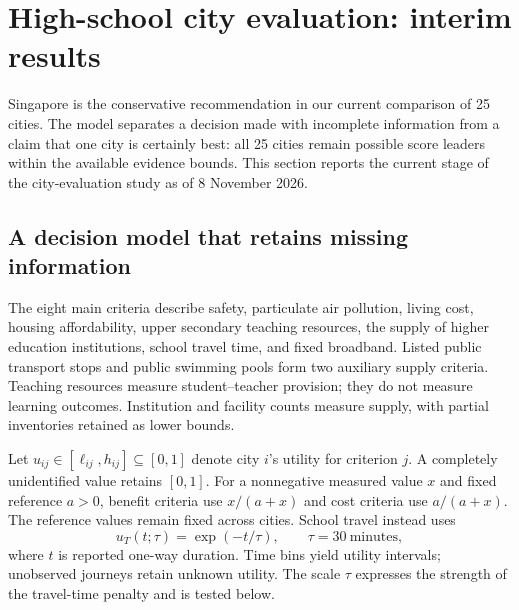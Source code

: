 \clearpage
\begingroup
\setlength{\tabcolsep}{5pt}
\setlength{\parskip}{0.35\baselineskip}
\section{High-school city evaluation: interim results}
\label{sec:t4progress}

Singapore is the conservative recommendation in our current comparison of
25 cities. The model separates a decision made with incomplete information
from a claim that one city is certainly best: all 25 cities remain possible
score leaders within the available evidence bounds. This section reports the
current stage of the city-evaluation study as of 8 November 2026.

\subsection{A decision model that retains missing information}
The eight main criteria describe safety, particulate air pollution, living
cost, housing affordability, upper secondary teaching resources, the supply
of higher education institutions, school travel time, and fixed broadband. Listed public
transport stops and public swimming pools form two auxiliary supply criteria.
Teaching resources measure student--teacher provision; they do not measure
learning outcomes. Institution and facility counts measure supply, with partial
inventories retained as lower bounds.

Let $u_{ij}\in[\ell_{ij},h_{ij}]\subseteq[0,1]$ denote city $i$'s utility
for criterion $j$. A completely unidentified value retains $[0,1]$.
For a nonnegative measured value $x$ and fixed reference $a>0$, benefit
criteria use $x/(a+x)$ and cost criteria use $a/(a+x)$. The reference values
remain fixed across cities. School travel instead uses
\begin{equation}
 u_T(t;\tau)=\exp(-t/\tau),\qquad \tau=30\ \text{minutes},
 \label{eq:t4travel}
\end{equation}
where $t$ is reported one-way duration. Time bins yield utility intervals;
unobserved journeys retain unknown utility. The scale $\tau$ expresses the
strength of the travel-time penalty and is tested below.

